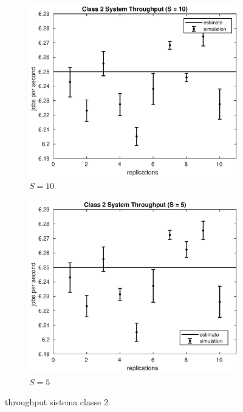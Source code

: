 \begin{figure}[!h]
%
\begin{subfigure}[t]{0.49\textwidth}
\includegraphics[width=\textwidth]{figures/simul/10_500K_x2}
\caption{$S = 10$}
\label{10_x2}
\end{subfigure}
%
\begin{subfigure}[t]{0.49\textwidth}
\includegraphics[width=\textwidth]{figures/simul/5_500K_x2}
\caption{$S = 5$}
\label{5_x2}
\end{subfigure}
%
\caption{throughput sistema classe 2}
\label{plot:x2}
\end{figure}
%
%
